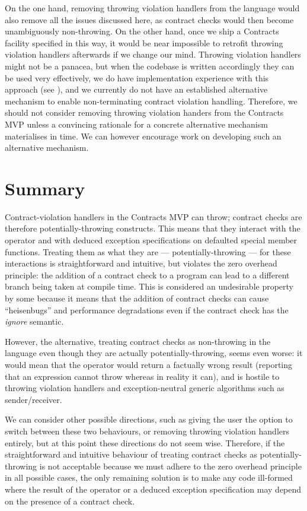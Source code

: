 On the one hand, removing throwing violation handlers from the language would also remove all the issues discussed here, as contract checks would then become unambiguously non-throwing. On the other hand, once we ship a Contracts facility specified in this way, it would be near impossible to retrofit throwing violation handlers afterwards if we change our mind. Throwing violation handlers might not be a panacea, but when the codebase is written accordingly they can be used very effectively, we do have implementation experience with this approach (see \cite{P2698R0}), and we currently do not have an established alternative mechanism to enable non-terminating contract violation handling. Therefore, we should not consider removing throwing violation handers from the Contracts MVP unless a convincing rationale for a concrete alternative mechanism materialises in time. We can however encourage work on developing such an alternative mechanism.

\section{Summary}

Contract-violation handlers in the Contracts MVP can throw; contract checks are therefore potentially-throwing constructs. This means that they interact with the  operator and with deduced exception specifications on defaulted special member functions. Treating them as what they are --- potentially-throwing --- for these interactions is straightforward and intuitive, but violates the zero overhead principle: the addition of a contract check to a program can lead to a different branch being taken at compile time. This is considered an undesirable property by some because it means that the addition of contract checks can cause ``heisenbugs'' and performance degradations even if the contract check has the \emph{ignore} semantic.

However, the alternative, treating contract checks as non-throwing in the language even though they are actually potentially-throwing, seems even worse: it would mean that the  operator would return a factually wrong result (reporting that an expression cannot throw whereas in reality it can), and is hostile to throwing violation handlers and exception-neutral generic algorithms such as sender/receiver.

We can consider other possible directions, such as giving the user the option to switch between these two behaviours, or removing throwing violation handlers entirely, but at this point these directions do not seem wise. Therefore, if the straightforward and intuitive behaviour of treating contract checks as potentially-throwing is not acceptable because we must adhere to the zero overhead principle in all possible cases, the only remaining solution is to make any code ill-formed where the result of the  operator or a deduced exception specification may depend on the presence of a contract check.


